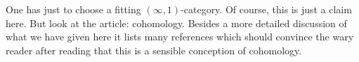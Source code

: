 One has just to choose a fitting $(\infty,1)$-category. Of course, this is just a claim here. But look at the \cite{wiki-nlab0000} article: cohomology. Besides a more detailed discussion of what we have given here it lists many references which should convince the wary reader after reading that this is a sensible conception of cohomology.
